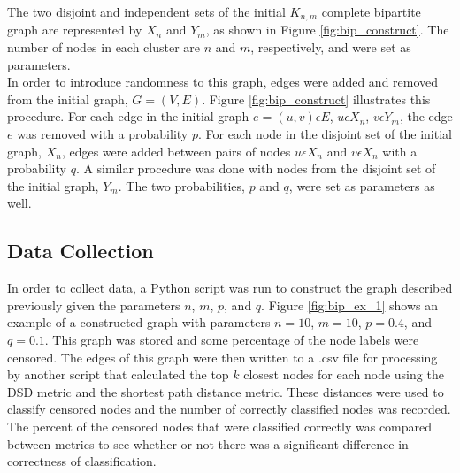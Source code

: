 \documentclass[12pt]{report}
\begin{document}
\noindent
The two disjoint and independent sets of the initial $K_{n,m}$ complete bipartite graph are represented by $X_{n}$ and $Y_{m}$, as shown in Figure \ref{fig:bip_construct}. The number of nodes in each cluster are $n$ and $m$, respectively, and were set as parameters.\\

\noindent
In order to introduce randomness to this graph, edges were added and removed from the initial graph, $G = (V,E)$. Figure \ref{fig:bip_construct} illustrates this procedure. For each edge in the initial graph $e=(u,v) \epsilon E$, $u \epsilon X_{n}$, $v \epsilon Y_{m}$, the edge $e$ was removed with a probability $p$. For each node in the disjoint set of the initial graph, $X_{n}$, edges were added between pairs of nodes $u \epsilon X_{n}$ and $v \epsilon X_{n}$ with a probability $q$. A similar procedure was done with nodes from the disjoint set of the initial graph, $Y_{m}$. The two probabilities, $p$ and $q$, were set as parameters as well.\\

\subsection{Data Collection}
\noindent
In order to collect data, a Python script was run to construct the graph described previously given the parameters $n$, $m$, $p$, and $q$. Figure \ref{fig:bip_ex_1} shows an example of a constructed graph with parameters $n=10$, $m=10$, $p=0.4$, and $q=0.1$. This graph was stored and some percentage of the node labels were censored. The edges of this graph were then written to a .csv file for processing by another script that calculated the top $k$ closest nodes for each node using the DSD metric and the shortest path distance metric. These distances were used to classify censored nodes and the number of correctly classified nodes was recorded. The percent of the censored nodes that were classified correctly was compared between metrics to see whether or not there was a significant difference in correctness of classification.\\
\end{document}
